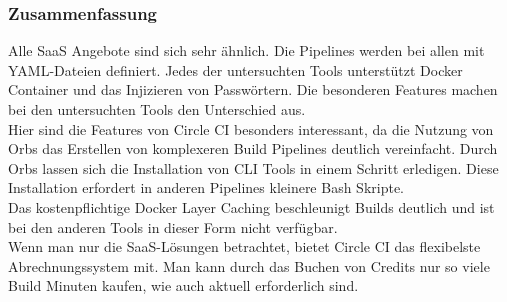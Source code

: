 \subsubsection{Zusammenfassung}\label{ci_services_zusammenfassung}

Alle SaaS Angebote sind sich sehr ähnlich.
Die Pipelines werden bei allen mit YAML-Dateien definiert.
Jedes der untersuchten Tools unterstützt Docker Container und das Injizieren von Passwörtern.
Die besonderen Features machen bei den untersuchten Tools den Unterschied aus. \\

Hier sind die Features von Circle CI besonders interessant, da die Nutzung von Orbs das Erstellen von komplexeren Build Pipelines deutlich vereinfacht.
Durch Orbs lassen sich die Installation von CLI Tools in einem Schritt erledigen.
Diese Installation erfordert in anderen Pipelines kleinere Bash Skripte. \\

Das kostenpflichtige Docker Layer Caching beschleunigt Builds deutlich und ist bei den anderen Tools in dieser Form nicht verfügbar. \\

Wenn man nur die SaaS-Lösungen betrachtet, bietet Circle CI das flexibelste Abrechnungssystem mit.
Man kann durch das Buchen von Credits nur so viele Build Minuten kaufen, wie auch aktuell erforderlich sind.
